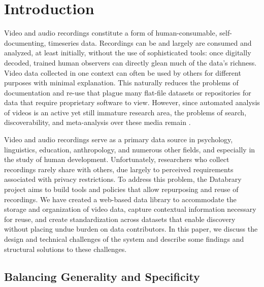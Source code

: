 \documentclass{sig-alternate}
\begin{document}


\section{Introduction}
Video and audio recordings constitute a form of human-consumable, self-documenting, timeseries data.
Recordings can be and largely are consumed and analyzed, at least initially, without the use of sophisticated tools: once digitally decoded, trained human observers can directly glean much of the data's richness.
Video data collected in one context can often be used by others for different purposes with minimal explanation.
This naturally reduces the problems of documentation and re-use that plague many flat-file datasets or repositories for data that require proprietary software to view.
However, since automated analysis of videos is an active yet still immature research area, the problems of search, discoverability, and meta-analysis over these media remain \cite{Albertson_2013, Lanagan_Smeaton_2012}.

Video and audio recordings serve as a primary data source in psychology, linguistics, education, anthropology, and numerous other fields, and especially in the study of human development.
Unfortunately, researchers who collect recordings rarely share with others, due largely to perceived requirements associated with privacy restrictions.
To address this problem, the Databrary project aims to build tools and policies that allow repurposing and reuse of recordings.
We have created a web-based data library to accommodate the storage and organization of video data, capture contextual information necessary for reuse, and create standardization across datasets that enable discovery without placing undue burden on data contributors.
In this paper, we discuss the design and technical challenges of the system and describe some findings and structural solutions to these challenges.

\subsection{Balancing Generality and Specificity}
\end{document}
